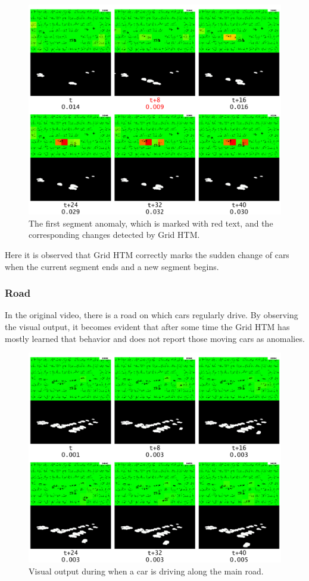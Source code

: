 \begin{figure}[H]
    \centering
    \includegraphics[width=\textwidth]{resources/experiments/surveillance/surveillance_anomaly_1.png}
    \caption{The first segment anomaly, which is marked with red text,  and the corresponding changes detected by Grid HTM.}
    \label{fig:surveillance_segment}
\end{figure}
Here it is observed that Grid HTM correctly marks the sudden change of cars when the current segment ends and a new segment begins.
\subsubsection{Road}
In the original video, there is a road on which cars regularly drive. By observing the visual output, it becomes evident that after some time the Grid HTM has mostly learned that behavior and does not report those moving cars as anomalies.
\begin{figure}[H]
    \centering
    \includegraphics[width=\textwidth]{resources/experiments/surveillance/surveillance_road_1.png}
    \caption{Visual output during when a car is driving along the main road.}
\end{figure}
